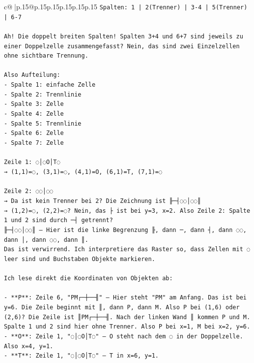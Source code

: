 \documentclass{article}
\begin{document}
{\begin{supertabular}{c@{$\;$}|p{.15\linewidth}@{}p{.15\linewidth}p{.15\linewidth}p{.15\linewidth}p{.15\linewidth}p{.15\linewidth}}
{{{\texttt{Spalten: 1 | 2(Trenner) | 3{-}4 | 5(Trenner) | 6{-}7} \\
\\ 
\texttt{Ah! Die doppelt breiten Spalten! Spalten 3+4 und 6+7 sind jeweils zu einer Doppelzelle zusammengefasst? Nein, das sind zwei Einzelzellen ohne sichtbare Trennung.} \\
\\ 
\texttt{Also Aufteilung:} \\
\texttt{{-} Spalte 1: einfache Zelle} \\
\texttt{{-} Spalte 2: Trennlinie} \\
\texttt{{-} Spalte 3: Zelle} \\
\texttt{{-} Spalte 4: Zelle} \\
\texttt{{-} Spalte 5: Trennlinie} \\
\texttt{{-} Spalte 6: Zelle} \\
\texttt{{-} Spalte 7: Zelle} \\
\\ 
\texttt{Zeile 1: ◌│◌O│T◌} \\
\texttt{→ (1,1)=◌, (3,1)=◌, (4,1)=O, (6,1)=T, (7,1)=◌} \\
\\ 
\texttt{Zeile 2: ◌◌│◌◌} \\
\texttt{→ Da ist kein Trenner bei 2? Die Zeichnung ist ╟─┤◌◌│◌◌║} \\
\texttt{→ (1,2)=◌, (2,2)=◌? Nein, das ├ ist bei y=3, x=2. Also Zeile 2: Spalte 1 und 2 sind durch ─┤ getrennt? } \\
\texttt{╟─┤◌◌│◌◌║ — Hier ist die linke Begrenzung ╟, dann ─, dann ┤, dann ◌◌, dann │, dann ◌◌, dann ║.} \\
\texttt{Das ist verwirrend. Ich interpretiere das Raster so, dass Zellen mit ◌ leer sind und Buchstaben Objekte markieren.} \\
\\ 
\texttt{Ich lese direkt die Koordinaten von Objekten ab:} \\
\\ 
\texttt{{-} **P**: Zeile 6, "PM┌─┼──╢" — Hier steht "PM" am Anfang. Das ist bei y=6. Die Zeile beginnt mit ║, dann P, dann M. Also P bei (1,6) oder (2,6)? Die Zeile ist ║PM┌─┼──╢. Nach der linken Wand ║ kommen P und M. Spalte 1 und 2 sind hier ohne Trenner. Also P bei x=1, M bei x=2, y=6.} \\
\texttt{{-} **O**: Zeile 1, "◌│◌O│T◌" — O steht nach dem ◌ in der Doppelzelle. Also x=4, y=1.} \\
\texttt{{-} **T**: Zeile 1, "◌│◌O│T◌" — T in x=6, y=1.} \\
}}}
\end{supertabular}}
\end{document}
